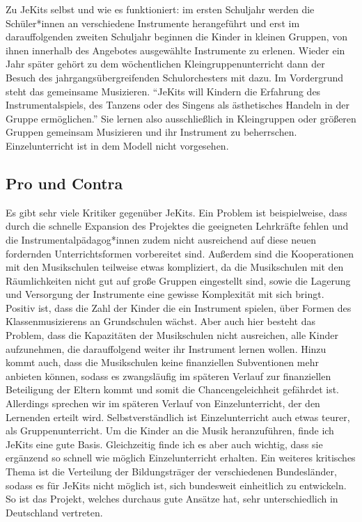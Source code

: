 Zu JeKits selbst und wie es funktioniert: im ersten Schuljahr werden die
Schüler*innen an verschiedene Instrumente herangeführt und erst im
darauffolgenden zweiten Schuljahr beginnen die Kinder in kleinen Gruppen, von
ihnen innerhalb des Angebotes ausgewählte Instrumente zu erlenen. Wieder ein
Jahr später gehört zu dem wöchentlichen Kleingruppenunterricht dann der Besuch
des jahrgangsübergreifenden Schulorchesters mit dazu. Im Vordergrund steht das
gemeinsame Musizieren. \enquote{JeKits will Kindern die Erfahrung des
Instrumentalspiels, des Tanzens oder des Singens als ästhetisches Handeln in der
Gruppe ermöglichen.}
\autocite{https://de.wikipedia.org/wiki/JeKits}
Sie lernen also ausschließlich in Kleingruppen oder größeren Gruppen gemeinsam
Musizieren und ihr Instrument zu beherrschen. Einzelunterricht ist in dem Modell
nicht vorgesehen.


\subsection{Pro und Contra}
Es gibt sehr viele Kritiker gegenüber JeKits. Ein Problem ist beispielweise,
dass durch die schnelle Expansion des Projektes die geeigneten Lehrkräfte fehlen
und die Instrumentalpädagog*innen zudem nicht ausreichend auf diese neuen
fordernden Unterrichtsformen vorbereitet sind. Außerdem sind die Kooperationen
mit den Musikschulen teilweise etwas kompliziert, da die Musikschulen mit den
Räumlichkeiten nicht gut auf große Gruppen eingestellt sind, sowie die Lagerung
und Versorgung der Instrumente eine gewisse Komplexität mit sich bringt. Positiv
ist, dass die Zahl der Kinder die ein Instrument spielen,
über Formen des Klassenmusizierens an Grundschulen wächst.
\autocite[119]{ernst:die_zukunftsfaehige_musikschule} Aber auch hier besteht das
Problem, dass die Kapazitäten der Musikschulen nicht ausreichen, alle Kinder
aufzunehmen, die darauffolgend weiter ihr Instrument lernen wollen. Hinzu kommt
auch, dass die Musikschulen keine finanziellen Subventionen mehr anbieten
können, sodass es zwangsläufig im späteren Verlauf zur finanziellen Beteiligung
der Eltern kommt und somit die Chancengeleichheit gefährdet ist. Allerdings
sprechen wir im späteren Verlauf von Einzelunterricht, der den Lernenden erteilt
wird. Selbstverständlich ist Einzelunterricht auch etwas teurer, als
Gruppenunterricht. Um die Kinder an die Musik heranzuführen, finde ich JeKits
eine gute Basis. Gleichzeitig finde ich es aber auch wichtig, dass sie ergänzend
so schnell wie möglich Einzelunterricht erhalten. Ein weiteres kritisches Thema
ist die Verteilung der Bildungsträger der verschiedenen Bundesländer, sodass es
für JeKits nicht möglich ist, sich bundesweit einheitlich zu entwickeln. So ist
das Projekt, welches durchaus gute Ansätze hat, sehr unterschiedlich in
Deutschland vertreten. 
